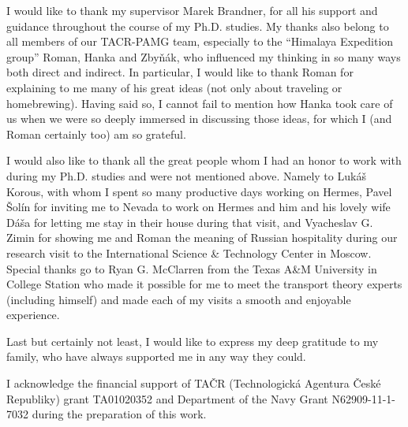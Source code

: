 

\begin{acknowledgements}      %

I would like to thank my supervisor Marek Brandner, for all his support and guidance throughout the course of 
my Ph.D. studies. My thanks also belong to all members of our TACR-PAMG team, especially to the ``Himalaya
Expedition group'' Roman, Hanka and Zby{\v n}{\' a}k, who influenced my thinking in so many ways both direct and
indirect. In particular, I would like to thank Roman for explaining to me many of his great ideas (not only about
traveling or homebrewing). Having said so, I cannot fail to mention how Hanka took care of us when we were so deeply
immersed in discussing those ideas, for which I (and Roman certainly too) am so grateful.

I would also like to thank all the great people whom I had an honor to work with during my Ph.D. studies and were
not mentioned above. Namely to Luk{\' a}{\v s} Korous, with whom I spent so many productive days working on Hermes,
Pavel {\v S}ol{\' i}n for inviting me to Nevada to work on Hermes and him and his lovely wife D{\' a}{\v s}a for
letting me stay in their house during that visit, and Vyacheslav G. Zimin for
showing me and Roman the meaning of Russian hospitality during our research visit to the International Science \&
Technology Center in Moscow. Special thanks go to Ryan G. McClarren from the Texas A\&M University in College Station who made it
possible for me to meet the transport theory experts (including himself) and made each of my visits a smooth and
enjoyable experience.

Last but certainly not least, I would like to express my deep gratitude to my family, who have always supported me in
any way they could.

\vfill{}
I acknowledge the financial support of 
TA\v{C}R (Technologick\'{a} Agentura \v{C}esk\'{e} Republiky)
grant TA01020352 and Department of the Navy Grant N62909-11-1-7032 during the preparation of this work.

\end{acknowledgements}



